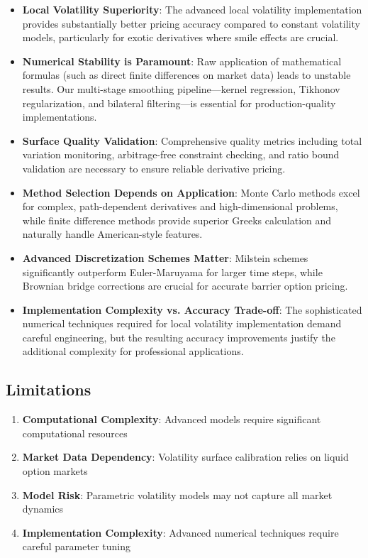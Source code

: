\documentclass[11pt,a4paper]{article}
\begin{document}
\begin{itemize}
\item \textbf{Local Volatility Superiority}: The advanced local volatility implementation provides substantially better pricing accuracy compared to constant volatility models, particularly for exotic derivatives where smile effects are crucial.

\item \textbf{Numerical Stability is Paramount}: Raw application of mathematical formulas (such as direct finite differences on market data) leads to unstable results. Our multi-stage smoothing pipeline—kernel regression, Tikhonov regularization, and bilateral filtering—is essential for production-quality implementations.

\item \textbf{Surface Quality Validation}: Comprehensive quality metrics including total variation monitoring, arbitrage-free constraint checking, and ratio bound validation are necessary to ensure reliable derivative pricing.

\item \textbf{Method Selection Depends on Application}: Monte Carlo methods excel for complex, path-dependent derivatives and high-dimensional problems, while finite difference methods provide superior Greeks calculation and naturally handle American-style features.

\item \textbf{Advanced Discretization Schemes Matter}: Milstein schemes significantly outperform Euler-Maruyama for larger time steps, while Brownian bridge corrections \cite{Broadie1997} are crucial for accurate barrier option pricing.

\item \textbf{Implementation Complexity vs. Accuracy Trade-off}: The sophisticated numerical techniques required for local volatility implementation demand careful engineering, but the resulting accuracy improvements justify the additional complexity for professional applications.
\end{itemize}

\subsection{Limitations}

\begin{enumerate}
\item \textbf{Computational Complexity}: Advanced models require significant computational resources
\item \textbf{Market Data Dependency}: Volatility surface calibration relies on liquid option markets
\item \textbf{Model Risk}: Parametric volatility models may not capture all market dynamics
\item \textbf{Implementation Complexity}: Advanced numerical techniques require careful parameter tuning
\end{enumerate}
\end{document}
